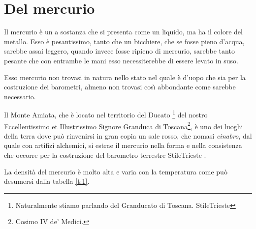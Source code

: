 \documentclass[b5paper,10pt,twoside,cucitura]{toptesi}
\begin{document}
\section{Del mercurio}
Il mercurio {\`e} un a sostanza che si presenta come un liquido, ma ha il colore
del metallo. Esso {\`e} pesantissimo, tanto che un bicchiere, che se fosse pieno
d'acqua, sarebbe assai leggero, quando invece fosse ripieno di mercurio,
sarebbe tanto pesante che con entrambe le mani esso necessiterebbe di essere
levato in suso.

Esso mercurio non trovasi in natura nello stato nel quale {\`e} d'uopo che sia
per la costruzione dei barometri, almeno non trovasi cos{\`\i} abbondante come
sarebbe necessario.

\setcounter{footnote}{25}

Il Monte Amiata, che {\`e} locato nel territorio del Ducato%
\footnote{Naturalmente stiamo parlando del Granducato di Toscana.%
\expandafter\ifx\csname StileTrieste\endcsname\NoteWhiteLine\fi
}
del nostro Eccellentissimo et Illustrissimo Signore Granduca di Toscana\footnote{Cosimo IV de' Medici.}, {\`e} uno dei
luoghi della terra dove pu{\`o} rinvenirsi in gran copia un sale rosso, che
nomasi {\em cinabro}, dal quale con artifizi alchemici, si estrae il mercurio
nella forma e nella consistenza che occorre per la costruzione del barometro
terrestre%
\expandafter\ifx\csname StileTrieste\endcsname
{}\fi.


La densit{\`a} del mercurio {\`e} molto alta e varia con la temperatura come
pu{\`o} desumersi dalla tabella \ref{t:1}.
\end{document}
